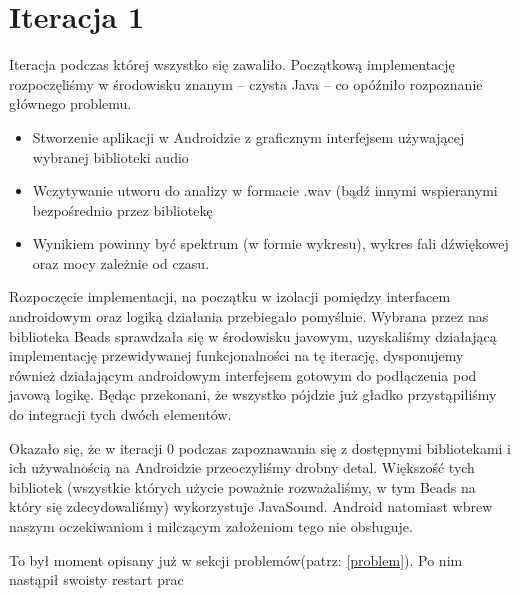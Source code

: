 \section{Iteracja 1}
Iteracja podczas której wszystko się zawaliło. Początkową implementację rozpoczęliśmy w środowisku
znanym -- czysta Java -- co opóźniło rozpoznanie głównego problemu.

\begin{Note}


\begin{itemize}
    \item Stworzenie aplikacji w Androidzie z graficznym interfejsem używającej wybranej biblioteki audio
    \item Wczytywanie utworu do analizy w formacie .wav (bądź innymi wspieranymi bezpośrednio przez bibliotekę
    \item Wynikiem powinny być spektrum (w formie wykresu), wykres fali dźwiękowej oraz mocy zależnie od czasu.
\end{itemize}


Rozpoczęcie implementacji, na początku w izolacji pomiędzy interfacem androidowym oraz logiką działania przebiegało pomyślnie. Wybrana przez nas biblioteka Beads sprawdzała się w środowisku javowym, uzyskaliśmy działającą implementację przewidywanej funkcjonalności na tę iterację, dysponujemy również działającym androidowym interfejsem gotowym do podłączenia pod javową logikę. Będąc przekonani, że wszystko pójdzie już gładko przystąpiliśmy do integracji tych dwóch elementów.


Okazało się, że w iteracji 0 podczas zapoznawania się z dostępnymi bibliotekami i ich używalnością na Androidzie przeoczyliśmy drobny detal. Większość tych bibliotek (wszystkie których użycie poważnie rozważaliśmy, w tym Beads na który się zdecydowaliśmy) wykorzystuje JavaSound. Android natomiast wbrew naszym oczekiwaniom i milczącym założeniom tego nie obsługuje.

\end{Note}

To był moment opisany już w sekcji problemów(patrz: \ref{problem}). Po nim nastąpił swoisty restart prac

